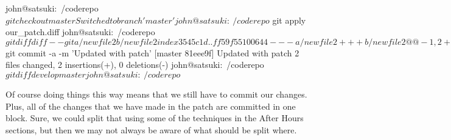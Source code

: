 \begin{code}
john@satsuki:~/coderepo$ git checkout master
Switched to branch 'master'
john@satsuki:~/coderepo$ git apply our_patch.diff
john@satsuki:~/coderepo$ git diff
diff --git a/newfile2 b/newfile2
index 3545c1d..ff59f55 100644
--- a/newfile2
+++ b/newfile2
@@ -1,2 +1,3 @@
 Another new file
 and a new awesome feature
+newer dev work
diff --git a/newfile3 b/newfile3
index 638113c..2e00739 100644
--- a/newfile3
+++ b/newfile3
@@ -1 +1,2 @@
 These changes are in the origin
+new dev work
john@satsuki:~/coderepo$ git commit -a -m 'Updated with patch'
[master 81eee9f] Updated with patch
 2 files changed, 2 insertions(+), 0 deletions(-)
john@satsuki:~/coderepo$ git diff develop master
john@satsuki:~/coderepo$
\end{code}

Of course doing things this way means that we still have to commit our changes.
Plus, all of the changes that we have made in the patch are committed in one block.
Sure, we could split that using some of the techniques in the After Hours sections, but then we may not always be aware of what should be split where.
